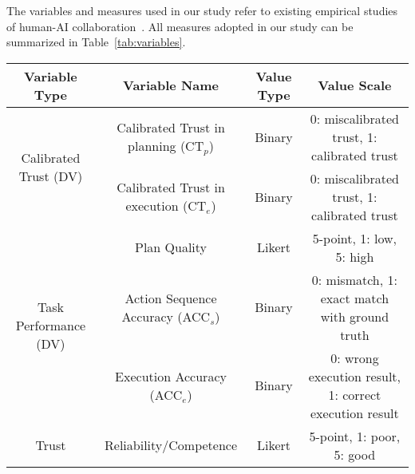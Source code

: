 The variables and measures used in our study refer to existing empirical studies of human-AI collaboration~\cite{lai2021towards}. 
All measures adopted in our study can be summarized in Table~\ref{tab:variables}. 
\begin{table*}[htbp]
	\centering
	\caption{The different variables considered in our experimental study. ``DV'' refers to the dependent variable.}
	\label{tab:variables}
	\begin{footnotesize}
	\begin{tabular}{c | c | c | c}
	    \hline
	    \textbf{Variable Type}&	\textbf{Variable Name}& \textbf{Value Type}& \textbf{Value Scale}\\
	    \hline \hline

	    \hline
         \multirow{2}{*}{Calibrated Trust (DV)}& Calibrated Trust in planning (CT$_p$)& Binary& 0: miscalibrated trust, 1: calibrated trust\\
        & Calibrated Trust in execution (CT$_e$)& Binary& 0: miscalibrated trust, 1: calibrated trust\\
        \hline
	    \multirow{3}{*}{Task Performance (DV)}& Plan Quality& Likert& 5-point, 1: low, 5: high\\
        & Action Sequence Accuracy (ACC$_s$)& Binary& 0: mismatch, 1: exact match with ground truth\\
        & Execution Accuracy (ACC$_e$)& Binary& 0: wrong execution result, 1: correct execution result\\
	    \hline
     \multirow{4}{*}{Trust}& Reliability/Competence& Likert& 5-point, 1: poor, 5: good\\

\end{tabular}
\end{footnotesize}
\end{table*}
